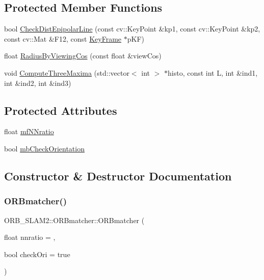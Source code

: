 \subsection*{Protected Member Functions}
\begin{DoxyCompactItemize}
\item 
bool \mbox{\hyperlink{class_o_r_b___s_l_a_m2_1_1_o_r_bmatcher_a10df000eeb05466a5bbfd7b40c7db45d}{Check\+Dist\+Epipolar\+Line}} (const cv\+::\+Key\+Point \&kp1, const cv\+::\+Key\+Point \&kp2, const cv\+::\+Mat \&F12, const \mbox{\hyperlink{class_o_r_b___s_l_a_m2_1_1_key_frame}{Key\+Frame}} $\ast$p\+KF)
\item 
float \mbox{\hyperlink{class_o_r_b___s_l_a_m2_1_1_o_r_bmatcher_ae6ae0904b9919f1141ef4a790cd34bfe}{Radius\+By\+Viewing\+Cos}} (const float \&view\+Cos)
\item 
void \mbox{\hyperlink{class_o_r_b___s_l_a_m2_1_1_o_r_bmatcher_ad6613e26706798c507b5266cdd101311}{Compute\+Three\+Maxima}} (std\+::vector$<$ int $>$ $\ast$histo, const int L, int \&ind1, int \&ind2, int \&ind3)
\end{DoxyCompactItemize}
\subsection*{Protected Attributes}
\begin{DoxyCompactItemize}
\item 
float \mbox{\hyperlink{class_o_r_b___s_l_a_m2_1_1_o_r_bmatcher_a08f6ee66568fa5a79600ed5ad8443893}{mf\+N\+Nratio}}
\item 
bool \mbox{\hyperlink{class_o_r_b___s_l_a_m2_1_1_o_r_bmatcher_a996a27217749aa15d2210c6dc6228495}{mb\+Check\+Orientation}}
\end{DoxyCompactItemize}


\subsection{Constructor \& Destructor Documentation}
\mbox{\label{class_o_r_b___s_l_a_m2_1_1_o_r_bmatcher_a6ca536b80e44da0f56fcd35ff8c6a833}} 
\subsubsection{\texorpdfstring{O\+R\+Bmatcher()}{ORBmatcher()}}
{\footnotesize\ttfamily O\+R\+B\+\_\+\+S\+L\+A\+M2\+::\+O\+R\+Bmatcher\+::\+O\+R\+Bmatcher (\begin{DoxyParamCaption}\item[{float}]{nnratio = {},  }\item[{bool}]{check\+Ori = {\ttfamily true} }\end{DoxyParamCaption})}

